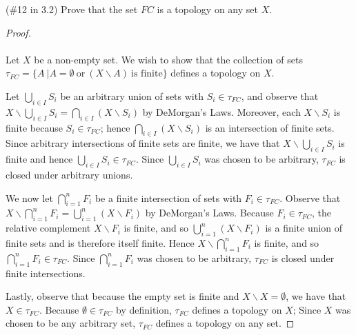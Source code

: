 (\#12 in 3.2) Prove that the set $FC$ is a topology on any set $X$.

\begin{proof}\ \\\\
    Let $X$ be a non-empty set. We wish to show that the collection of sets \linebreak
    $\tau_{FC} = \{A~| A = \emptyset~\text{or}~ \left(X \backslash A\right) ~ \text{is finite}\}$ defines a topology on
    $X$.

    Let $\bigcup\limits_{i \in I}{S_i}$ be an arbitrary union of sets with $S_i \in \tau_{FC}$, and observe that 
    $X \backslash \bigcup\limits_{i \in I}{S_i} = \bigcap\limits_{i \in I}{\left(X \backslash S_i\right)}$ by DeMorgan's
    Laws. Moreover, each $X \backslash S_i$ is finite because $S_i \in \tau_{FC}$; hence
    $\bigcap\limits_{i \in I}{\left(X \backslash S_i\right)}$ is an intersection of finite sets. Since arbitrary 
    intersections of finite sets are finite, we have that $X \backslash \bigcup\limits_{i \in I}{S_i}$ is finite and 
    hence $\bigcup\limits_{i \in I}{S_i} \in \tau_{FC}$. Since $\bigcup\limits_{i \in I}{S_i}$ was chosen to be 
    arbitrary, $\tau_{FC}$ is closed under arbitrary unions.

    We now let $\bigcap\limits_{i=1}^{n}{F_{i}}$ be a finite intersection of sets with $F_i \in \tau_{FC}$. Observe that
    \linebreak $X \backslash \bigcap\limits_{i=1}^{n}{F_{i}} = \bigcup\limits_{i=1}^{n}{\left(X \backslash F_i\right)}$ 
    by DeMorgan's Laws. Because $F_i \in \tau_{FC}$, the relative complement $X \backslash F_i$ is finite, and so 
    $\bigcup\limits_{i=1}^{n}{\left(X \backslash F_i\right)}$ is a finite union of finite sets and is therefore itself
    finite. Hence $X \backslash \bigcap\limits_{i=1}^{n}{F_{i}}$ is finite, and so 
    $\bigcap\limits_{i=1}^{n}{F_{i}} \in \tau_{FC}$. Since $\bigcap\limits_{i=1}^{n}{F_{i}}$ was chosen to be arbitrary,
    $\tau_{FC}$ is closed under finite intersections.

    Lastly, observe that because the empty set is finite and $X \backslash X = \emptyset$, we have that
    $X \in \tau_{FC}$. Because $\emptyset \in \tau_{FC}$ by definition, $\tau_{FC}$ defines a topology on $X$; Since
    $X$ was chosen to be any arbitrary set, $\tau_{FC}$ defines a topology on any set.

\end{proof}